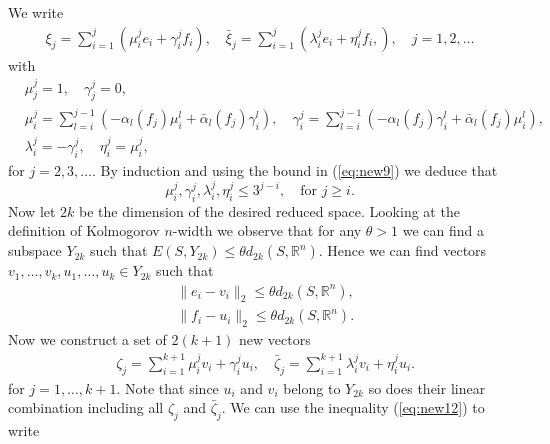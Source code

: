 \documentclass[final]{siamart}
\begin{document}
We write
\begin{equation} \label{eq:new10}
\begin{aligned}
	\xi_j = \sum_{i=1}^j \left( \mu_i^j e_i + \gamma_i^j f_i \right), \quad \bar{\xi}_j = \sum_{i=1}^j \left( \lambda_i^j e_i + \eta_i^j f_i,  \right), \quad j=1,2,\dots
\end{aligned}
\end{equation}
with
\begin{equation} \label{eq:new11}
\begin{aligned}
	&\mu^j_j = 1, \quad \gamma^j_j = 0, \\
	&\mu_i^j = \sum_{l=i}^{j-1}\left( - \alpha_l(f_j) \mu_i^l  + \bar{\alpha}_l(f_j) \gamma_i^l \right), \quad\gamma_i^j = \sum_{l=i}^{j-1}\left( - \alpha_l(f_j) \gamma_i^l  + \bar{\alpha}_l(f_j) \mu_i^l \right), \\
	&\lambda^j_i = - \gamma ^j_i, \quad \eta^j_i = \mu^j_i,
\end{aligned}
\end{equation}
for $j=2,3,\dots$. By induction and using the bound in (\ref{eq:new9}) we deduce that
\begin{equation} \label{eq:new12}
	\mu^j_i,\gamma^j_i,\lambda^j_i,\eta^j_i \leq 3^{j-i}, \quad \text{for } j\geq i.
\end{equation}
Now let $2k$ be the dimension of the desired reduced space. Looking at the definition of Kolmogorov $n$-width we observe that for any $\theta > 1$ we can find a subspace $Y_{2k}$ such that $E(S,Y_{2k}) \leq \theta d_{2k}(S,\mathbb R^n)$. Hence we can find vectors $v_1,\dots,v_k,u_1,\dots,u_k\in Y_{2k}$ such that
\begin{equation} \label{eq:new13}
\begin{aligned}
	& \|e_i - v_i\|_2 \leq \theta d_{2k}(S,\mathbb R^n), \\
	& \|f_i - u_i\|_2 \leq \theta d_{2k}(S,\mathbb R^n).
\end{aligned}
\end{equation}
Now we construct a set of $2(k+1)$ new vectors
\begin{equation} \label{eq:new14}
\begin{aligned}
	& \zeta_j = \sum_{i=1}^{k+1} \mu_i^j v_i + \gamma^j_i u_i,\quad \bar{\zeta}_j = \sum_{i=1}^{k+1} \lambda_i^j v_i + \eta^j_i u_i.
\end{aligned}
\end{equation}
for $j = 1,\dots,k+1$. Note that since $u_i$ and $v_i$ belong to $Y_{2k}$ so does their linear combination including all $\zeta_j$ and $\bar{\zeta}_j$. We can use the inequality (\ref{eq:new12}) to write
\end{document}
